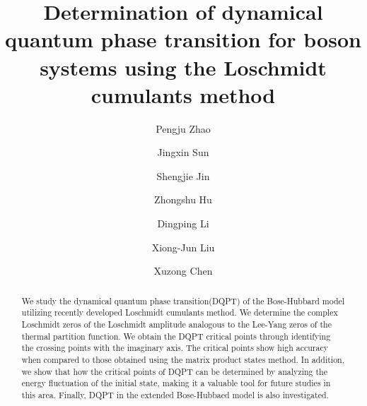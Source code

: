 \documentclass[%
reprint,
superscriptaddress,
amsmath,amssymb,
aps,
pra,
floatfix,
]{revtex4-1}
\begin{document}

\title{Determination of dynamical quantum phase transition for boson systems using the Loschmidt cumulants method}

\author{Pengju Zhao}

\author{Jingxin Sun}%

\author{Shengjie Jin}

\author{Zhongshu Hu}

\author{Dingping Li}

\author{Xiong-Jun Liu}

\author{Xuzong Chen}%

\begin{abstract} 
	


We study the dynamical quantum phase transition(DQPT) of the Bose-Hubbard model utilizing recently developed Loschmidt cumulants method. We determine the complex Loschmidt zeros of the Loschmidt amplitude analogous to the Lee-Yang zeros of the thermal partition function. We obtain the DQPT critical points through identifying the crossing points with the imaginary axis. The critical points show high accuracy when compared to those obtained using the matrix product states method.
In addition, we show that how the critical points of DQPT can be determined by analyzing the energy fluctuation of the initial state, making it a valuable tool for future studies in this area.  Finally, DQPT in the extended Bose-Hubbaed model is also investigated.


\end{abstract}
\maketitle
\end{document}
